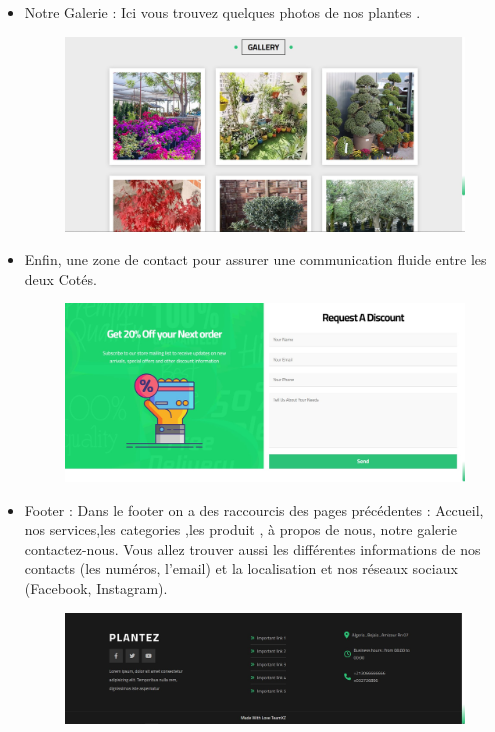 \documentclass[a4paper,12pt,oneside]{article}
\begin{document}
{\begin{enumerate}
\begin{itemize}
		\item Notre Galerie : Ici vous trouvez quelques photos de nos plantes .
		\begin{figure}[h]
  		\centering
  		\includegraphics[width=1\textwidth]{gallery}
		\end{figure}
		
		\newpage
		\item Enfin, une zone de contact pour assurer une communication fluide entre les deux
Cotés.
		\begin{figure}[h]
  		\centering
  		\includegraphics[width=1\textwidth]{contact}
		\end{figure}
		
		\item Footer : Dans le footer on a des raccourcis des pages précédentes : Accueil, nos
services,les categories ,les produit , à propos de nous, notre galerie contactez-nous.
Vous allez trouver aussi les différentes informations de nos contacts (les numéros, l’email) et la localisation et nos réseaux sociaux (Facebook,
Instagram).
		\begin{figure}[h]
  		\centering
  		\includegraphics[width=1\textwidth]{footer}
		\end{figure}
		

\end{itemize}
\end{enumerate}}
\end{document}
